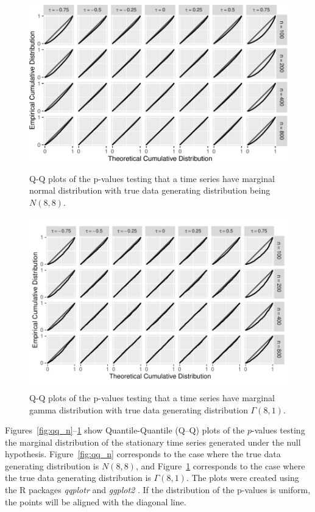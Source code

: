 \documentclass[12pt]{article}
\begin{document}
\begin{figure}[tbp]
  \includegraphics[width = .9\textwidth]{figures/normal}
  \centering
  \caption{Q-Q plots of the p-values testing that a time series
    have marginal normal distribution with true data generating distribution
    being $N(8,8)$.}
  \label{fig:qq_n}
    \hspace{5cm}
  \includegraphics[width = .9\textwidth]{figures/gamma}
  \caption{Q-Q plots of the p-values testing that a time series
    have marginal gamma distribution with true data
    generating distribution $\Gamma(8,1)$.}
  \label{fig:qq_g}
\end{figure}

Figures~\ref{fig:qq_n}--\ref{fig:qq_g} show Quantile-Quantile (Q--Q) plots
of the $p$-values testing the marginal distribution of the stationary time
series generated under the null hypothesis. Figure~\ref{fig:qq_n} corresponds
to the case where the true data generating distribution is $N(8,8)$, and
Figure~\ref{fig:qq_g} corresponds to the case where the true data generating
distribution is $\Gamma(8,1)$. The plots were created using the R packages
\textsl{qqplotr} and \textsl{ggplot2} \citep{qqplotr, ggplot2}. If the
distribution of the p-values is uniform, the points will be aligned with the
diagonal line.
\end{document}
